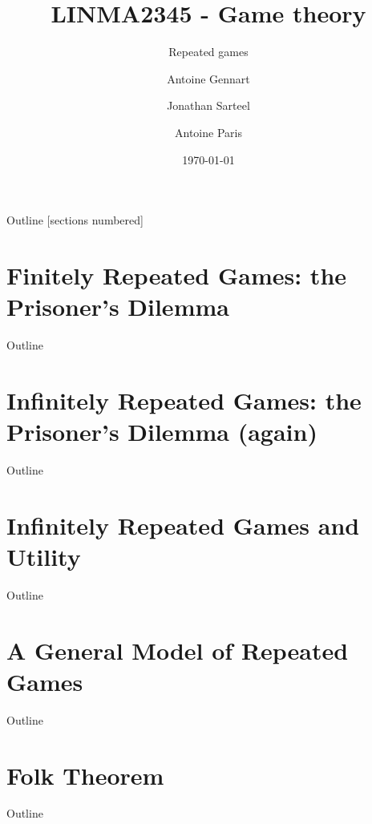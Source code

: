 \documentclass[10pt, notes, handout]{beamer}
\title{LINMA2345 - Game theory}
\subtitle{Repeated games}
\date{\today}
\author{Antoine Gennart\and Jonathan Sarteel\and Antoine Paris}
\institute{Ecole polytechnique de Louvain}
\begin{document}
\maketitle


\begin{frame}{Outline}
    [sections numbered]
    \tableofcontents[hideallsubsections]
\end{frame}

\section{Finitely Repeated Games: the Prisoner's Dilemma}
\begin{frame}{Outline}
    \tableofcontents[currentsection]
\end{frame}



\section{Infinitely Repeated Games: the Prisoner's Dilemma (again)}
\begin{frame}{Outline}
    \tableofcontents[currentsection]
\end{frame}



\section{Infinitely Repeated Games and Utility}
\begin{frame}{Outline}
    \tableofcontents[currentsection]
\end{frame}



\section{A General Model of Repeated Games}
\begin{frame}{Outline}
    \tableofcontents[currentsection]
\end{frame}



\section{Folk Theorem}
\begin{frame}{Outline}
    \tableofcontents[currentsection]
\end{frame}
\end{document}
